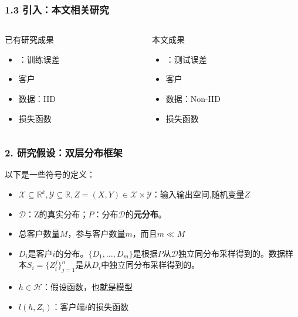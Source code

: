 \documentclass{beamer}
\begin{document}
\begin{frame}
    \frametitle{1.3 引入：本文相关研究}
    \begin{columns}[T] %
        \begin{column}{.5\textwidth}
        \begin{exampleblock}{已有研究成果}
            \begin{itemize}
                \item {\color{red}{最优化}}：训练误差
                \item {\color{red}{参与}}客户
                \item {\color{red}{同质性}}数据：IID
                \item {\color{red}{有界}}损失函数
            \end{itemize}
        \end{exampleblock}
        \end{column}%


        \begin{column}{.5\textwidth}
        \begin{alertblock}{本文成果}
            \begin{itemize}
                \item {\color{red}{泛化误差}}：测试误差
                \item {\color{red}{未参与}}客户
                \item {\color{red}{异质性}}数据：Non-IID
                \item {\color{red}{无界}}损失函数
            \end{itemize}
        \end{alertblock}
        \end{column}%
        \end{columns}

\end{frame}

\begin{frame}
    \frametitle{2. 研究假设：双层分布框架}
    以下是一些符号的定义：
    \begin{itemize}
        \item $\mathcal{X}\subseteq \mathbb{R}^{k},\mathcal{Y}\subseteq \mathbb{R},Z=(X,Y)\in{\mathcal{X}\times\mathcal{Y}} $：输入输出空间,随机变量$Z$
        \item $\mathcal{D}$：Z的真实分布；$P$：分布$\mathcal{D}$的\textbf{元分布}。 
        \item 总客户数量$M$，参与客户数量$m$，而且$ m\ll M $
        \item $D_{i}$是客户$i$的分布。$\{D_{1},\dots,D_{m}\}$是根据$P$从$\mathcal{D}$独立同分布采样得到的。数据样本$S_{i}=\{Z_{i}^{j}\}_{j=1}^{n}$是从$D_{i}$中独立同分布采样得到的。
        \item $h \in \mathcal{H}$：假设函数，也就是模型
        \item $l(h,Z_{i})$：客户端$i$的损失函数
    \end{itemize}
\end{frame}
\end{document}
